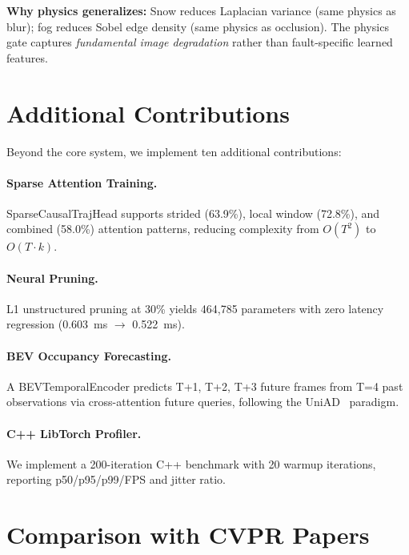 \documentclass[10pt,twocolumn]{article}
\begin{document}
\noindent\textbf{Why physics generalizes:} Snow reduces Laplacian
variance (same physics as blur); fog reduces Sobel edge density
(same physics as occlusion). The physics gate captures
\textit{fundamental image degradation} rather than fault-specific
learned features.

\section{Additional Contributions}
\label{sec:additional}

Beyond the core system, we implement ten additional contributions:

\paragraph{Sparse Attention Training.}
SparseCausalTrajHead supports strided (63.9\%), local window (72.8\%),
and combined (58.0\%) attention patterns, reducing complexity from
$O(T^2)$ to $O(T \cdot k)$.

\paragraph{Neural Pruning.}
L1 unstructured pruning at 30\% yields 464,785 parameters with zero
latency regression (0.603~ms $\to$ 0.522~ms).

\paragraph{BEV Occupancy Forecasting.}
A BEVTemporalEncoder predicts T+1, T+2, T+3 future frames from T=4
past observations via cross-attention future queries, following the
UniAD~\cite{hu2023uniad} paradigm.

\paragraph{C++ LibTorch Profiler.}
We implement a 200-iteration C++ benchmark with 20 warmup iterations,
reporting p50/p95/p99/FPS and jitter ratio.

\section{Comparison with CVPR Papers}
\label{sec:comparison}
\end{document}
